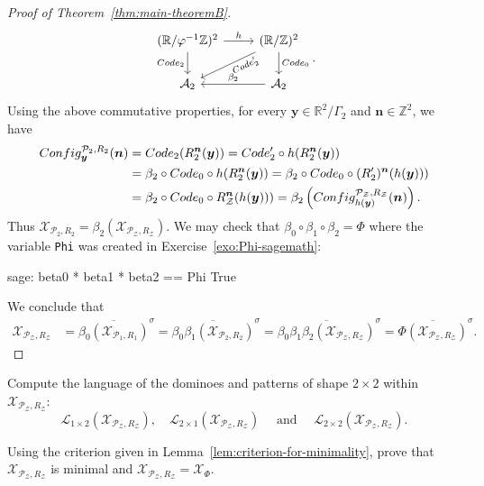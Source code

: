 \documentclass[12pt]{amsart}
\newcommand{\Z}{\mathbb{Z}}
\newcommand{\R}{\mathbb{R}}
\newcommand{\bn}{{\boldsymbol{n}}}
\newcommand{\by}{{\boldsymbol{y}}}
\newcommand{\Acal}{\mathcal{A}} %
\newcommand{\Lcal}{\mathcal{L}}
\newcommand{\Pcal}{\mathcal{P}}
\newcommand{\Xcal}{\mathcal{X}} %
\newcommand{\Zcal}{\mathcal{Z}}
\newcommand{\shiftclosure}[1]{{\overline{#1}^{\sigma}}}
\newcommand{\scConfig}{\textsc{Config}}
\newcommand{\sccode}{\textsc{Code}}
\begin{document}
\begin{proof}[Proof of Theorem~\ref{thm:main-theoremB}]
\[\begin{tikzcd}
    (\R/\varphi^{-1}\Z)^2 \arrow{r}{h} \arrow[swap]{d}{\sccode_2}
    & (\R/\Z)^2 \arrow[swap,sloped,near start]{ld}{\sccode_2'} \arrow{d}{\sccode_0}\\%
    \Acal_2 
    & \Acal_2 \arrow[swap]{l}{\beta_2} 
\end{tikzcd}.
\]
Using the above commutative properties, for every $\by\in\R^2/\Gamma_2$ and
$\bn\in\Z^2$, we have
\begin{align*}
    \scConfig^{\Pcal_2,R_2}_{\by} (\bn)
    &= \sccode_2(R_2^\bn (\by))
    = \sccode_2' \circ h(R_2^\bn (\by))\\
    &= \beta_2\circ\sccode_0 \circ h(R_2^\bn (\by))
    = \beta_2\circ\sccode_0 \circ (R_2')^\bn (h(\by)))\\
    &= \beta_2\circ\sccode_0 \circ R_\Zcal^\bn (h(\by)))
    = \beta_2\left(\scConfig^{\Pcal_\Zcal,R_\Zcal}_{h(\by)} (\bn)\right).
\end{align*}
    Thus $\Xcal_{\Pcal_2,R_2} =\beta_2\left(\Xcal_{\Pcal_\Zcal,R_\Zcal}\right)$.
We may check that $\beta_0\circ\beta_1\circ\beta_2=\Phi$
where the variable \texttt{Phi} was created in Exercise~\ref{exo:Phi-sagemath}:
\begin{sagecommandlinetcb}
\begin{sagecommandline}
sage: beta0 * beta1 * beta2 == Phi
True
\end{sagecommandline}
\end{sagecommandlinetcb}
\noindent
We conclude that
\begin{align*}
    \Xcal_{\Pcal_\Zcal,R_\Zcal}
    &= \shiftclosure{\beta_0(\Xcal_{\Pcal_1,R_1})}
    = \shiftclosure{\beta_0\beta_1(\Xcal_{\Pcal_2,R_2})}
    = \shiftclosure{\beta_0\beta_1\beta_2\left(\Xcal_{\Pcal_\Zcal,R_\Zcal}\right)}
    = \shiftclosure{\Phi\left(\Xcal_{\Pcal_\Zcal,R_\Zcal}\right)}.
\end{align*}
\end{proof}


\begin{exo}[label={exo:XPZRZ-domino-language}]
    Compute the language of the dominoes and patterns of shape $2\times2$
    within $\Xcal_{\Pcal_\Zcal,R_\Zcal}$:
    \[
        \Lcal_{1\times 2}(\Xcal_{\Pcal_\Zcal,R_\Zcal}),\quad
        \Lcal_{2\times 1}(\Xcal_{\Pcal_\Zcal,R_\Zcal})
        \quad
        \text{ and }
        \quad
        \Lcal_{2\times 2}(\Xcal_{\Pcal_\Zcal,R_\Zcal}).
    \]
\end{exo}


\begin{exo}[label={exo:XPZRZ=XPhi}]
    Using the criterion given in Lemma~\ref{lem:criterion-for-minimality},
    prove that $\Xcal_{\Pcal_\Zcal,R_\Zcal}$ is minimal
    and $\Xcal_{\Pcal_\Zcal,R_\Zcal}=\Xcal_\Phi$.
\end{exo}
\end{document}
